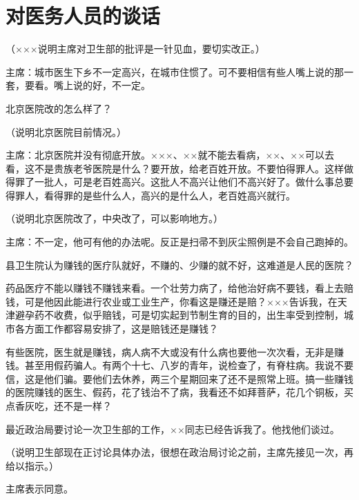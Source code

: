 \section[对医务人员的谈话（一九六五年七月十九日）]{对医务人员的谈话}


（×××说明主席对卫生部的批评是一针见血，要切实改正。）

主席：城市医生下乡不一定高兴，在城市住惯了。可不要相信有些人嘴上说的那一套，要看。嘴上说的好，不一定。

北京医院改的怎么样了？

（说明北京医院目前情况。）

主席：北京医院并没有彻底开放。×××、××就不能去看病，××、××可以去看，这不是贵族老爷医院是什么？要开放，给老百姓开放。不要怕得罪人。这样做得罪了一批人，可是老百姓高兴。这批人不高兴让他们不高兴好了。做什么事总要得罪人，看得罪的是些什么人，高兴的是什么人，老百姓高兴就行。

（说明北京医院改了，中央改了，可以影响地方。）

主席：不一定，他可有他的办法呢。反正是扫帚不到灰尘照例是不会自己跑掉的。

县卫生院认为赚钱的医疗队就好，不赚的、少赚的就不好，这难道是人民的医院？

药品医疗不能以赚钱不赚钱来看。一个壮劳力病了，给他治好病不要钱，看上去赔钱，可是他因此能进行农业或工业生产，你看这是赚还是赔？×××告诉我，在天津避孕药不收费，似乎赔钱，可是切实起到节制生育的目的，出生率受到控制，城市各方面工作都容易安排了，这是赔钱还是赚钱？

有些医院，医生就是赚钱，病人病不大或没有什么病也要他一次次看，无非是赚钱。甚至用假药骗人。有两个十七、八岁的青年，说检查了，有脊柱病。我说不要信，这是他们骗。要他们去休养，两三个星期回来了还不是照常上班。搞一些赚钱的医院赚钱的医生、假药，花了钱治不了病，我看还不如拜菩萨，花几个铜板，买点香灰吃，还不是一样？

最近政治局要讨论一次卫生部的工作，××同志已经告诉我了。他找他们谈过。

（说明卫生部现在正讨论具体办法，很想在政治局讨论之前，主席先接见一次，再给以指示。）

主席表示同意。


